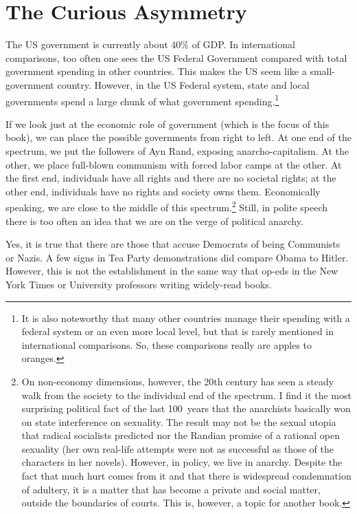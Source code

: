 \chapter{The Curious Asymmetry}

The US government is currently about 40\% of GDP. In international comparisons,
too often one sees the US Federal Government compared with total government
spending in other countries. This makes the US seem like a small-government
country. However, in the US Federal system, state and local governments spend a
large chunk of what government spending.\footnote{It is also noteworthy that
many other countries manage their spending with a federal system or an even
more local level, but that is rarely mentioned in international comparisons.
So, these comparisons really are apples to oranges.}

If we look just at the economic role of government (which is the focus of this
book), we can place the possible governments from right to left. At one end of
the spectrum, we put the followers of Ayn Rand, exposing anarcho-capitalism. At
the other, we place  full-blown communism with forced labor camps at the other.
At the first end, individuals have all rights and there are no societal rights;
at the other end, individuals have no rights and society owns them.
Economically speaking, we are close to the middle of this spectrum.\footnote{On
non-economy dimensions, however, the 20th century has seen a steady walk from
the society to the individual end of the spectrum. I find it the most
surprising political fact of the last 100~years that the anarchists basically
won on state interference on sexuality. The result may not be the sexual utopia
that radical socialists predicted nor the Randian promise of a rational open
sexuality (her own real-life attempts were not as successful as those of the
characters in her novels). However, in policy, we live in anarchy. Despite the
fact that much hurt comes from it and that there is widespread condemnation of
adultery, it is a matter that has become a private and social matter, outside
the boundaries of courts.  This is, however, a topic for another book.} Still,
in polite speech there is too often an idea that we are on the verge of
political anarchy.

Yes, it is true that there are those that accuse Democrats of being Communists
or Nazis. A few signs in Tea Party demonstrations did compare Obama to Hitler.
However, this is not the establishment in the same way that op-eds in the New
York Times or University professors writing widely-read books.

